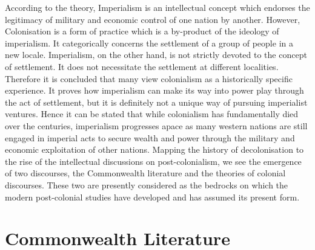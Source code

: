 According to the theory, Imperialism is an intellectual concept which endorses the legitimacy of military and economic control of one nation by another. However, Colonisation is a form of practice which is a by-product of the ideology of imperialism. It categorically concerns the settlement of a group of people in a new locale. Imperialism, on the other hand, is not strictly devoted to the concept of settlement. It does not necessitate the settlement at different localities. Therefore it is concluded that many view colonialism as a historically specific experience. It proves how imperialism can make its way into power play through the act of settlement, but it is definitely not a unique way of pursuing imperialist ventures. Hence it can be stated that while colonialism has fundamentally died over the centuries, imperialism progresses apace as many western nations are still engaged in imperial acts to secure wealth and power through the military and economic exploitation of other nations. Mapping the history of decolonisation to the rise of the intellectual discussions on post-colonialism, we see the emergence of two discourses, the Commonwealth literature and the theories of colonial discourses. These two are presently considered as the bedrocks on which the modern post-colonial studies have developed and has assumed its present form.

\section{Commonwealth Literature}

